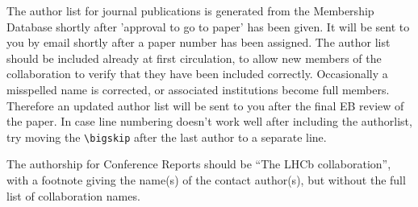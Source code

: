 \documentclass[12pt,a4paper]{article}
\begin{document}

%
 
\newpage


The author list for journal publications is generated from the Membership Database shortly after 'approval to go to paper' has been given.
It will be sent to you by email shortly after a paper number has been assigned.
The author list should be included already at first circulation,
to allow new members of the collaboration to verify that they have been included correctly.
Occasionally a misspelled name is corrected, or associated institutions become full members.
Therefore an updated author list will be sent to you after the final EB review of the paper.
In case line numbering doesn't work well after including the authorlist, try moving the \verb!\bigskip! after the last author to a separate line.


The authorship for Conference Reports should be ``The LHCb                                                                                                                                                                                                                                                                                
  collaboration'', with a footnote giving the name(s) of the contact
  author(s), but without the full list of collaboration names.
\end{document}
